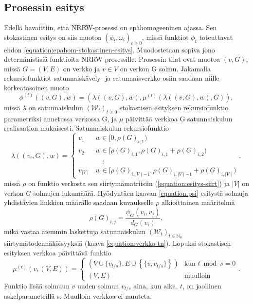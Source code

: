 \documentclass[finnish, 12pt, a4paper, sci, utf8, pdfa]{aaltothesis}
\newcommand{\N}{\mathbb{N}}
\newcommand{\Wrandom}{\mathcal{W}}
\begin{document}
\subsection{Prosessin esitys}

Edellä havaittiin, että NRRW-prosessi on epähomogeeninen ajassa. Sen stokastinen esitys on siis muotoa \( (\phi_{t}, \omega_{t})_{t \geq 0} \), missä funktiot \( \phi_{t} \) toteuttavat ehdon \ref{equation:epahom-stokastinen-esitys}. Muodostetaan sopiva jono deterministisiä funktioita NRRW-prosessille. Prosessin tilat ovat muotoa \( (v, G) \), missä \( G = (V, E) \) on verkko ja \( v \in V \) on verkon G solmu. Jakamalla rekursiofunktiot satunnaiskävely- ja satunnaisverkko-osiin saadaan niille korkeatasoinen muoto
\begin{equation}
   \phi^{(t)} \left( (v, G), w \right) = \left( \lambda\left( (v, G), w \right), \mu^{(t)} \left( \lambda\left( (v, G), w \right), G \right) \right),
   \label{equation:esitys-1}
\end{equation}
missä \( \lambda \) on satunnaiskulun \( (\Wrandom_{t})_{t \geq 0} \) stokastisen esityksen rekursiofunktio parametriksi annetussa verkossa G, ja \( \mu \) päivittää verkkoa G satunnaiskulun realisaation mukaisesti. Satunnaiskulun rekursiofunktio
\begin{equation}
   \lambda \left( (v_{i}, G), w \right) = 
   \begin{cases}
      v_{1} & w \in [0, \rho(G)_{i,1}) \\
      v_{2} & w \in [\rho(G)_{i,1}, \rho(G)_{i,1} + \rho(G)_{i,2}) \\
            & \quad \vdots \\
      v_{\mid V \mid} & w \in [\rho(G)_{i,\mid V \mid - 1}, \rho(G)_{i,\mid V \mid - 1} + \rho(G)_{i,\mid V \mid}) 
   \end{cases},
   \label{equation:esitys-kulku}
\end{equation}
missä \( \rho \) on funktio verkosta sen siirtymämatriisiin (\ref{equation:esitys-siirt}) ja $ |V| $ on verkon $ G $ solmujen lukumäärä. Hyödyntäen kaavan \ref{equation:psi} esitystä solmuja yhdistävien linkkien määrälle saadaan kuvaukselle \( \rho \) alkioittainen määritelmä
\begin{equation}
   \rho(G)_{i,j} = \frac{\psi_{G}(v_{i}, v_{j})}{d_{G}(v_{i})},
   \label{equation:esitys-siirt}
\end{equation}
mikä vastaa aiemmin laskettuja satunnaiskulun $ (\Wrandom_{t})_{t \in \N_{0}} $ siirtymätodennäköisyyksiä (kaava \ref{equation:verkko-tn}). Lopuksi stokastisen esityksen verkkoa päivittävä funktio
\begin{equation}
   \mu^{(t)} \left( v, (V, E) \right) =
   \begin{cases}
      \left( V \cup \{v_{t/s}\}, E \cup \left\{ \{ v, v_{t/s} \} \right\} \right) & \text{kun } t \bmod s = 0 \\
      \left( V, E \right) & \text{muulloin}
   \end{cases}.
   \label{equation:esitys-4}
\end{equation}
Funktio lisää solmuun \( v \) uuden solmun \( v_{t/s} \) aina, kun aika, $ t $, on jaollinen askelparametrillä s. Muulloin verkkoa ei muuteta.
\end{document}

